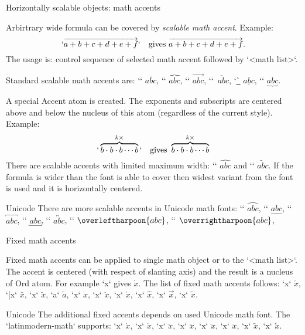 \secc Horizontally scalable objects: math accents

Arbirtrary wide formula can be covered by {\em scalable math accent}.
Example:
$$
  `\overrightarrow {a+b+c+d+e+f}` \quad \hbox{gives } \overrightarrow {a+b+c+d+e+f}.
$$
The usage is: control sequence of selected math accent followed by `{<math list>}`.

Standard scalable math accents are: 
`\overline` $\overline{abc}$, 
`\overbrace` $\overbrace{abc}$,
`\overrightarrow` $\overrightarrow{abc}$,
`\overleftarrow`~$\overleftarrow{abc}$, 
`\underline` $\underline{abc}$,
`\underbrace` $\underbrace{abc}$.

A special Accent atom is created. The exponents and subscripts are centered above
and below the nucleus of this atom (regardless of the current style). Example:
$$
  `\overbrace {b\cdot b\cdot b \cdots b}^{k\times}` \quad \hbox{gives }
  \overbrace {b\cdot b\cdot b \cdots b}^{k\times}
$$
There are scalable accents with limited maximum width:
`\widehat` $\widehat{abc}$ and `\widetilde` $\widetilde{abc}$. If the
formula is wider than the font is able to cover then widest variant from the
font is used and it is horizontally centered.

\new Unicode
There are more scalable accents in Unicode math fonts:
`\overparen` $\overparen{abc}$, `\underparen` $\underparen{abc}$,
`\overbracket` $\overbracket{abc}$, `\underbracket` $\underbracket{abc}$,
`\overleftrightarrow` $\overleftrightarrow{abc}$,
`\overleftharpoon` $\overleftharpoon{abc}$,
`\overrightharpoon` $\overrightharpoon{abc}$,


\secc Fixed math accents

Fixed math accents can be applied to single math object or to the `{<math list>}`. 
The accent is centered (with respect of slanting axis) and the result is a
nucleus of Ord
atom. For example `\dot x` gives $\dot x$. The list of fixed math accents
follows: `\acute x` $\acute x$, `\bar x` $\bar x$, 
`\breve x` $\breve x$, `\check a` $\check a$, 
`\dot x` $\dot x$, `\ddot x` $\ddot x$, 
`\grave x` $\grave x$, `\hat x` $\hat x$, 
`\vec x` $\vec x$, `\tilde x` $\tilde x$.

\new Unicode
The additional fixed accents depends on used Unicode math font. The
`latinmodern-math` supports:
`\ovhook x` $\ovhook x$, `\ocirc x` $\ocirc x$, 
`\leftharpoonaccent x` $\leftharpoonaccent x$, `\rightharpoonaccent x` $\rightharpoonaccent x$, 
`\dddot x` $\dddot x$, `\ddddot x` $\ddddot x$, 
`\widebridgeabove x` $\widebridgeabove x$, `\asteraccent x` $\asteraccent x$. 


